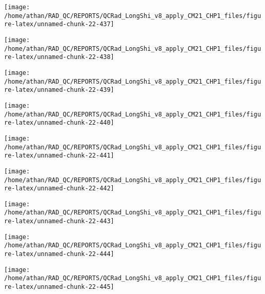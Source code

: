 \documentclass[
  10pt,
  a4paper,oneside]{article}
\begin{document}
\begin{center}\texttt{[image: /home/athan/RAD\_QC/REPORTS/QCRad\_LongShi\_v8\_apply\_CM21\_CHP1\_files/figure-latex/unnamed-chunk-22-437]} \end{center}

\begin{center}\texttt{[image: /home/athan/RAD\_QC/REPORTS/QCRad\_LongShi\_v8\_apply\_CM21\_CHP1\_files/figure-latex/unnamed-chunk-22-438]} \end{center}

\begin{center}\texttt{[image: /home/athan/RAD\_QC/REPORTS/QCRad\_LongShi\_v8\_apply\_CM21\_CHP1\_files/figure-latex/unnamed-chunk-22-439]} \end{center}

\begin{center}\texttt{[image: /home/athan/RAD\_QC/REPORTS/QCRad\_LongShi\_v8\_apply\_CM21\_CHP1\_files/figure-latex/unnamed-chunk-22-440]} \end{center}

\begin{center}\texttt{[image: /home/athan/RAD\_QC/REPORTS/QCRad\_LongShi\_v8\_apply\_CM21\_CHP1\_files/figure-latex/unnamed-chunk-22-441]} \end{center}

\begin{center}\texttt{[image: /home/athan/RAD\_QC/REPORTS/QCRad\_LongShi\_v8\_apply\_CM21\_CHP1\_files/figure-latex/unnamed-chunk-22-442]} \end{center}

\begin{center}\texttt{[image: /home/athan/RAD\_QC/REPORTS/QCRad\_LongShi\_v8\_apply\_CM21\_CHP1\_files/figure-latex/unnamed-chunk-22-443]} \end{center}

\begin{center}\texttt{[image: /home/athan/RAD\_QC/REPORTS/QCRad\_LongShi\_v8\_apply\_CM21\_CHP1\_files/figure-latex/unnamed-chunk-22-444]} \end{center}

\begin{center}\texttt{[image: /home/athan/RAD\_QC/REPORTS/QCRad\_LongShi\_v8\_apply\_CM21\_CHP1\_files/figure-latex/unnamed-chunk-22-445]} \end{center}
\end{document}
